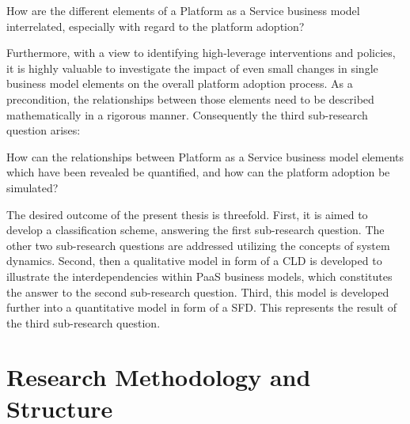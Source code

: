 \begin{SRQ}\label{srq2}
How are the different elements of a Platform as a Service business model interrelated, especially with regard to the platform adoption?
\end{SRQ}

Furthermore, with a view to identifying high-leverage interventions and policies, it is highly valuable to investigate the impact of even small changes in single business model elements on the overall platform adoption process. As a precondition, the relationships between those elements need to be described mathematically in a rigorous manner. Consequently the third sub-research question arises:

\begin{SRQ}\label{srq3}
How can the relationships between Platform as a Service business model elements which have been revealed be quantified, and how can the platform adoption be simulated?
\end{SRQ}

The desired outcome of the present thesis is threefold. First, it is aimed to develop a classification scheme, answering the first sub-research question. The other two sub-research questions are addressed utilizing the concepts of system dynamics. Second, then a qualitative model in form of a \acf{CLD} is developed to illustrate the interdependencies within \ac{PaaS} business models, which constitutes the answer to the second sub-research question. Third, this model is developed further into a quantitative model in form of a \acf{SFD}. This represents the result of the third sub-research question.
	
\section{Research Methodology and Structure}\label{ch:intro:met}

